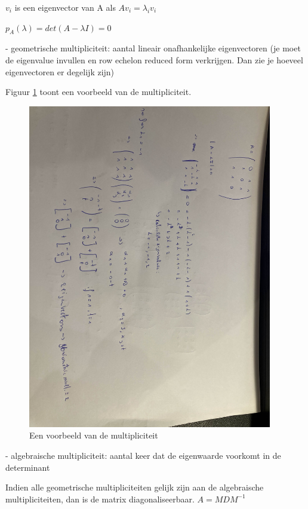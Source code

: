\documentclass[a4paper]{article}
\begin{document}
$v_i$ is een eigenvector van A als $Av_i = \lambda_i v_i$

$p_A(\lambda) = det(A - \lambda I) = 0$

- geometrische multipliciteit: aantal lineair onafhankelijke eigenvectoren (je moet de eigenvalue invullen en row echelon reduced form verkrijgen. Dan zie je hoeveel eigenvectoren er degelijk zijn)

Figuur \ref{fig:mult} toont een voorbeeld van de multipliciteit.

\begin{figure}[htbp!]
	\begin{center}
		\includegraphics[width=0.95\textwidth]{./images/mult.jpg}
	\end{center}
	\caption{Een voorbeeld van de multipliciteit}
	\label{fig:mult}
\end{figure}

- algebraische multipliciteit: aantal keer dat de eigenwaarde voorkomt in de determinant

Indien alle geometrische multipliciteiten gelijk zijn aan de algebraische multipliciteiten, dan is de matrix diagonaliseerbaar.
$A = MDM^{-1}$
\end{document}
